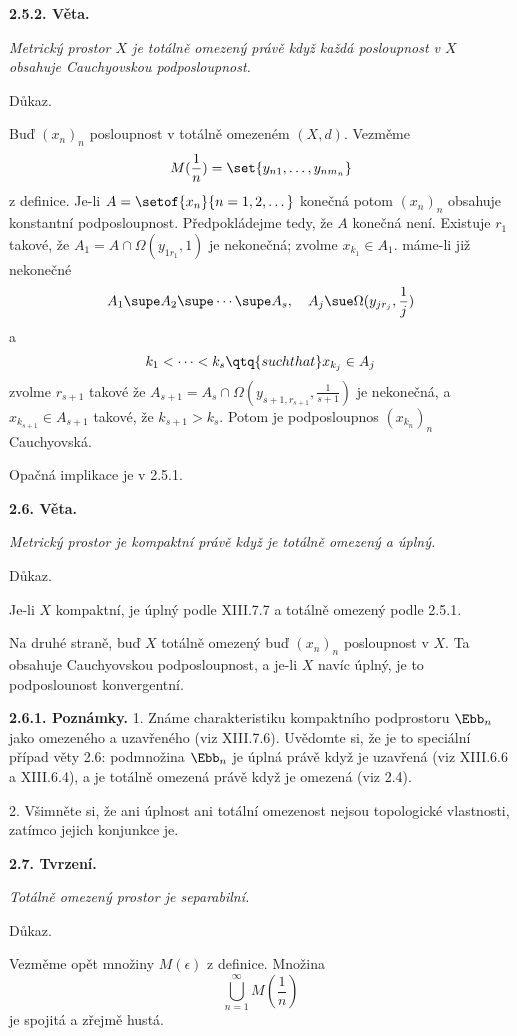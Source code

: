 \documentclass[12pt]{article}
\begin{document}
\medskip

{\bf 2.5.2. Věta.} {\em Metrický prostor  $X$ je totálně omezený právě když každá posloupnost v $X$ obsahuje Cauchyovskou podposloupnost.

Důkaz.} Buď $(x_n)_n$ posloupnost v totálně omezeném $(X,d)$. Vezměme
$$
M(\frac1n)=\set{y_{n1},\dots,y_{nm_n}}
$$
z definice. Je-li $A=\setof{x_n}{n=1,2,\dots}$ konečná potom $(x_n)_n$ obsahuje konstantní podposloupnost. Předpokládejme tedy, že  $A$  konečná není.
Existuje $r_1$  takové, že $A_1=A\cap\Omega(y_{1r_1},1)$ je nekonečná; zvolme $x_{k_1}\in A_1$. máme-li již nekonečné 
$$
A_1\supe A_2\supe\cdots\supe A_s, \quad A_j\sue\Omega(y_{jr_j},\frac1j)
$$
a 
$$
k_1<\dots<k_s \qtq{such that} x_{k_j}\in A_j
$$
zvolme $r_{s+1}$ takové že $A_{s+1}=A_s\cap\Omega(y_{s+1,r_{s+1}},\frac1{s+1})$ je nekonečná, a $x_{k_{s+1}}\in A_{s+1}$
takové, že $k_{s+1}>k_s$. Potom je podposloupnos $(x_{k_n})_n$ Cauchyovská.

Opačná implikace je v 2.5.1. \sq



\bigskip

{\bf 2.6. Věta.} {\em Metrický prostor je kompaktní právě když je totálně omezený a úplný.

Důkaz.} Je-li $X$ kompaktní, je úplný podle XIII.7.7  a totálně omezený podle 2.5.1. 

Na druhé straně, buď $X$ totálně omezený buď  $(x_n)_n$ posloupnost v $X$. Ta obsahuje Cauchyovskou podposloupnost, a je-li $X$ navíc úplný, je to podposlounost konvergentní. \sq

\medskip

{\bf 2.6.1. Poznámky.} 1. Známe charakteristiku kompaktního podprostoru $\Ebb_n$ jako omezeného a uzavřeného (viz XIII.7.6).
Uvědomte si, že je to speciální případ věty 2.6: podmnožina $\Ebb_n$ je úplná právě když je uzavřená (viz XIII.6.6  a XIII.6.4), a je totálně omezená právě když je omezená (viz 2.4).

\smallskip

2. Všimněte si, že ani úplnost ani totální omezenost nejsou topologické vlastnosti, zatímco jejich konjunkce je.

\bigskip

{\bf 2.7. Tvrzení.} {\em Totálně omezený prostor je separabilní.

Důkaz.} Vezměme opět množiny $M(\epsilon)$ z definice. Množina
$$
\bigcup_{n=1}^\infty M(\frac1n)
$$ 
je spojitá a zřejmě hustá. \sq

\medskip
\end{document}
